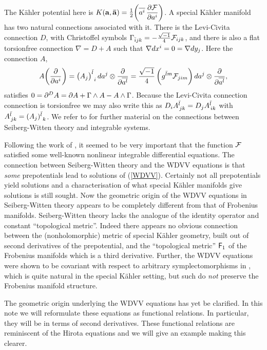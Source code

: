 \documentclass[a4paper,]{article}
\def\d{\partial}
\def\F{{\cal F}}
\def\f{{\sf F}}
\begin{document}
The K\"ahler potential here is 
$K({\bf a}, {\bf\bar a})=\frac{1}{2}\bigg(\overline{ a\sp{i}}\,\dfrac{\d \F}
{\d a\sp{i}}\bigg)$.
A special K\"ahler manifold  has two natural connections associated with it.
There is the Levi-Civita connection $D$, with Christoffel symbols
$\Gamma_{{\bar i}jk}=-\frac{\sqrt{-1}}{4}\F_{ijk}$, and there is also
a flat torsionfree connection $\nabla= D+A$ such that $\nabla d x\sp{i}=0
=\nabla d y_{j}$.
Here the connection $A$,
\begin{equation}
\label{connection}
A\bigg(\dfrac{\d }{\d a\sp{i}}\bigg)=\big(A_j\big)\sp{\bar l}_{\ i}\,
d a\sp{j}\otimes \dfrac{\d }{\d \overline{ a\sp{l}}}
=\dfrac{\sqrt{-1}}{4}\, \bigg(g\sp{{\bar l}m} \F_{jim}\bigg)\,
d a\sp{j}\otimes \dfrac{\d }{\d \overline{ a\sp{l}}},
\end{equation}
satisfies $0=\d\sp{D} A=\d A+\Gamma\wedge A-A\wedge \Gamma$.
Because the Levi-Civita connection connection is torsionfree we may also
write this as $D_i A\sp{\bar l}_{\, jk}=D_j A\sp{\bar l}_{\, ik}$
with $A\sp{\bar l}_{\, jk}=(A_j)\sp{\bar l}_{\ k}$.
We refer to \cite{mars, brkr} for further material on the connections
between Seiberg-Witten theory and integrable systems.

Following the work of \cite{GKMMM}, it seemed to be very important that the
function $\F$ satisfied some well-known nonlinear integrable differential 
equations.
The connection between Seiberg-Witten theory and the WDVV equations is
that {\it some} prepotentials lead to solutions of (\ref{WDVV}). Certainly not
all prepotentials yield solutions and a characterisation of what
special K\"ahler manifolds give solutions is still sought.
Now the geometric origin of the WDVV equations in Seiberg-Witten theory
appears to be completely different from that of Frobenius manifolds.
Seiberg-Witten theory lacks the analogue of the identity operator
and constant ``topological metric''. Indeed there appears no obvious connection
between the (nonholomorphic) metric of special K\"ahler geometry,
built out of second derivatives of the prepotential, and the
``topological metric'' $\f_1$ of the Frobenius manifolds which is a third
derivative.
Further,  the WDVV equations were shown to be covariant with respect to
arbitrary symplectomorphisms in \cite{dWM}, which is quite natural in
the special K\"ahler setting, but such do {\em not} preserve the 
Frobenius manifold structure.

The geometric origin underlying the WDVV equations has yet be clarified. 
In this note we will reformulate these equations as functional relations. 
In particular, they will be in terms of second derivatives.
These functional relations are reminiscent of the Hirota equations
and we will give an example making this clearer.
\end{document}
